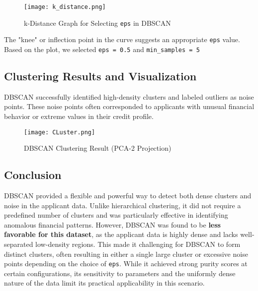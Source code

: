 \documentclass{article}
\begin{document}
\begin{figure}[h!]
    \centering
    \texttt{[image: k\_distance.png]}
    \caption{k-Distance Graph for Selecting \texttt{eps} in DBSCAN}
\end{figure}

The "knee" or inflection point in the curve suggests an appropriate \texttt{eps} value. Based on the plot, we selected \texttt{eps = 0.5} and \texttt{min\_samples = 5}

\subsection{Clustering Results and Visualization}

DBSCAN successfully identified high-density clusters and labeled outliers as noise points. These noise points often corresponded to applicants with unusual financial behavior or extreme values in their credit profile.

\begin{figure}[h!]
    \centering
    \texttt{[image: CLuster.png]}
    \caption{DBSCAN Clustering Result (PCA-2 Projection)}
\end{figure}

\newpage
\subsection*{Conclusion}

DBSCAN provided a flexible and powerful way to detect both dense clusters and noise in the applicant data. Unlike hierarchical clustering, it did not require a predefined number of clusters and was particularly effective in identifying anomalous financial patterns. However, DBSCAN was found to be \textbf{less favorable for this dataset}, as the applicant data is highly dense and lacks well-separated low-density regions. This made it challenging for DBSCAN to form distinct clusters, often resulting in either a single large cluster or excessive noise points depending on the choice of \texttt{eps}. While it achieved strong purity scores at certain configurations, its sensitivity to parameters and the uniformly dense nature of the data limit its practical applicability in this scenario.
\end{document}
